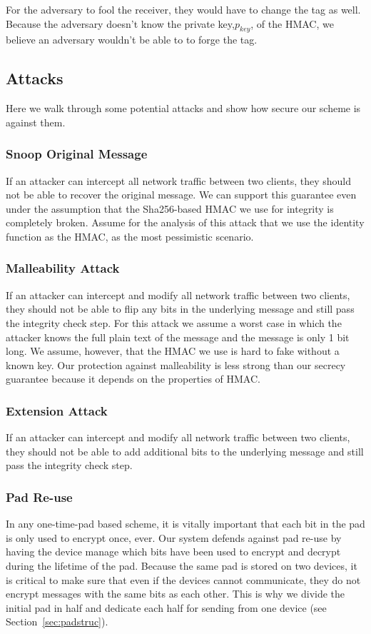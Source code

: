 \documentclass[twocolumn]{article}
\begin{document}
For the adversary to fool the receiver, they would have to change the tag as well. Because the adversary doesn't know the private key,$p_{key}$, of the HMAC, we believe an adversary wouldn't be able to to forge the tag.

\subsection{Attacks}
Here we walk through some potential attacks and show how secure our scheme is against them.

\subsubsection{Snoop Original Message}
If an attacker can intercept all network traffic between two clients, they should not be able to recover the original message.
We can support this guarantee even under the assumption that the Sha256-based HMAC we use for integrity is completely broken.
Assume for the analysis of this attack that we use the identity function as the HMAC, as the most pessimistic scenario.

\subsubsection{Malleability Attack}
If an attacker can intercept and modify all network traffic between two clients, they should not be able to flip any bits in the underlying message and still pass the integrity check step.
For this attack we assume a worst case in which the attacker knows the full plain text of the message and the message is only 1 bit long.
We assume, however, that the HMAC we use is hard to fake without a known key.
Our protection against malleability is less strong than our secrecy guarantee because it depends on the properties of HMAC.

\subsubsection{Extension Attack}
If an attacker can intercept and modify all network traffic between two clients, they should not be able to add additional bits to the underlying message and still pass the integrity check step.

\subsubsection{Pad Re-use}
In any one-time-pad based scheme, it is vitally important that each bit in the pad is only used to encrypt once, ever.
Our system defends against pad re-use by having the device manage which bits have been used to encrypt and decrypt during the lifetime of the pad.
Because the same pad is stored on two devices, it is critical to make sure that even if the devices cannot communicate, they do not encrypt messages with the same bits as each other. This is why we divide the initial pad in half and dedicate each half for sending from one device (see Section~\ref{sec:padstruc}).
\end{document}
